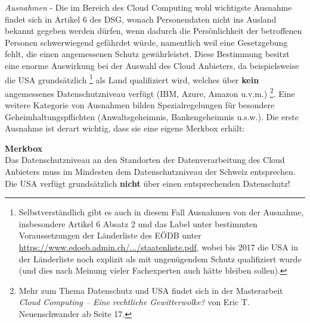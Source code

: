 \documentclass[a4paper,pointlessnumbers]{scrreprt}
\newcommand{\merkbox}[2][0.8\textwidth]{ \begin{center} \begin{tcolorbox}[enhanced, drop fuzzy midday shadow, width={#1}, opacityframe=0.5, colframe=BrickRed, colback=white] {\ECFTeenSpirit \color{BrickRed}\textbf{Merkbox} \qquad {\tiny das gilt es zu beachten}} \\  #2 \end{tcolorbox} \end{center}}
\begin{document}
\textit{Ausnahmen} - Die im Bereich des Cloud Computing wohl wichtigste Ausnahme findet sich in Artikel 6 des DSG, wonach Personendaten nicht ins Ausland bekannt gegeben werden dürfen, wenn dadurch die Persönlichkeit der betroffenen Personen schwerwiegend gefährdet würde, namentlich weil eine Gesetzgebung fehlt, die einen angemessenen Schutz gewährleistet. Diese Bestimmung besitzt eine enorme Auswirkung bei der Auswahl des Cloud Anbieters, da beispielsweise die USA grundsätzlich \footnote{Selbstverständlich gibt es auch in diesem Fall Ausnahmen von der Ausnahme, insbesondere Artikel 6 Absatz 2 und das Label \glqq unter bestimmten Voraussetzungen\grqq{} der Länderliste des EÖDB unter \href{https://www.edoeb.admin.ch/dam/edoeb/de/dokumente/2017/04/staatenliste.pdf.download.pdf/staatenliste.pdf}{https://www.edoeb.admin.ch/.../staatenliste.pdf}, wobei bis 2017 die USA in der Länderliste noch explizit als mit ungenügendem Schutz qualifiziert wurde (und dies nach Meinung vieler Fachexperten auch hätte bleiben sollen).} als Land qualifiziert wird, welches über \textbf{kein} angemessenes Datenschutzniveau verfügt (IBM, Azure, Amazon u.v.m.) \footnote{Mehr zum Thema Datenschutz und USA findet sich in der Masterarbeit \textit{Cloud Computing – Eine rechtliche Gewitterwolke?} von Eric T. Neuenschwander ab Seite 17.}. Eine weitere Kategorie von Ausnahmen bilden Spezialregelungen für besondere Geheimhaltungspflichten (Anwaltsgeheimnis, Bankengeheimnis u.s.w.). Die erste Ausnahme ist derart wichtig, dass sie eine eigene Merkbox erhält:

\merkbox[0.7\textwidth]{Das Datenschutzniveau an den Standorten der Datenverarbeitung des Cloud Anbieters muss im Mindesten dem Datenschutzniveau der Schweiz entsprechen. Die USA verfügt grundsätzlich \textbf{nicht} über einen entsprechenden Datenschutz!}
\end{document}
